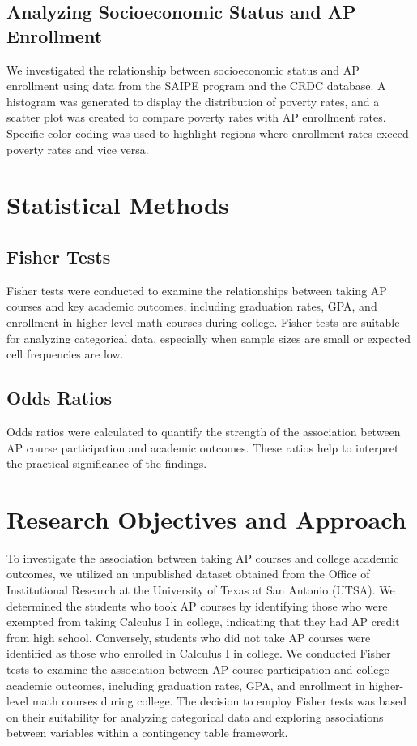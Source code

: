 \documentclass[sn-mathphys-num]{sn-jnl}%
\theoremstyle{thmstyleone}%
\theoremstyle{thmstyletwo}%
\theoremstyle{thmstylethree}%
\begin{document}
{\subsection{Analyzing Socioeconomic Status and AP Enrollment}

We investigated the relationship between socioeconomic status and AP enrollment using data from the SAIPE program and the CRDC database. A histogram was generated to display the distribution of poverty rates, and a scatter plot was created to compare poverty rates with AP enrollment rates. Specific color coding was used to highlight regions where enrollment rates exceed poverty rates and vice versa.\\

\section{Statistical Methods}

\subsection{Fisher Tests}

Fisher tests were conducted to examine the relationships between taking AP courses and key academic outcomes, including graduation rates, GPA, and enrollment in higher-level math courses during college. Fisher tests are suitable for analyzing categorical data, especially when sample sizes are small or expected cell frequencies are low.

\subsection{Odds Ratios}

Odds ratios were calculated to quantify the strength of the association between AP course participation and academic outcomes. These ratios help to interpret the practical significance of the findings.\\

\section{Research Objectives and Approach}

To investigate the association between taking AP courses and college academic outcomes, we utilized an unpublished dataset obtained from the Office of Institutional Research at the University of Texas at San Antonio (UTSA). We determined the students who took AP courses by identifying those who were exempted from taking Calculus I in college, indicating that they had AP credit from high school. Conversely, students who did not take AP courses were identified as those who enrolled in Calculus I in college. We conducted Fisher tests to examine the association between AP course participation and college academic outcomes, including graduation rates, GPA, and enrollment in higher-level math courses during college. The decision to employ Fisher tests was based on their suitability for analyzing categorical data and exploring associations between variables within a contingency table framework.\\

}
\end{document}
